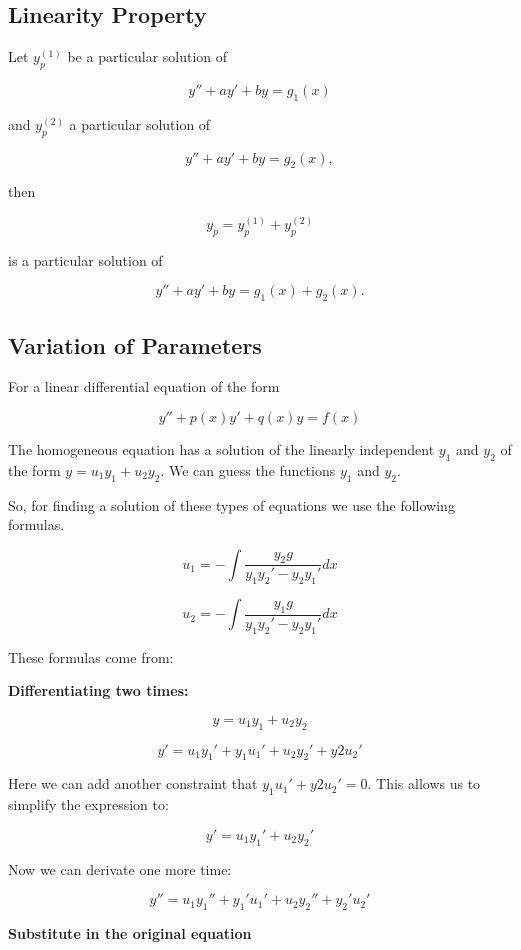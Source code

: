 \subsection{Linearity Property}

Let \( y_p^{(1)} \) be a particular solution of  

\[
    y'' + ay' + by = g_1(x)
\]  

and \( y_p^{(2)} \) a particular solution of  

\[
    y'' + ay' + by = g_2(x),
\]  

then  

\[
    y_p = y_p^{(1)} + y_p^{(2)}
\]  

is a particular solution of  

\[
    y'' + ay' + by = g_1(x) + g_2(x).
\]  

\subsection{Variation of Parameters}

For a linear differential equation of the form

\[
    y'' + p(x)y' + q(x)y = f(x)
\]

The homogeneous equation has a solution of the linearly independent \(y_1\) and \(y_2\)
of the form \(y = u_1 y_1 + u_2 y_2\). We can guess the functions \(y_1\) and \(y_2\).

So, for finding a solution of these types of equations we use the following formulas.

\[
    u_1 = - \int \frac{y_2 g}{y_1 y_{2}' - y_2 y_{1}'} dx
\]

\[
    u_2 = - \int \frac{y_1 g}{y_1 y_{2}' - y_2 y_{1}'} dx
\]

These formulas come from:

\textbf{Differentiating two times:}

\[
    y = u_1 y_1 + u_2 y_2
\]

\[
    y' = u_1 y_{1}' + y_1 u_{1}' +  u_2 y_{2}' + y{2} u_{2}'
\]

Here we can add another constraint that \(y_1 u_{1}' + y{2} u_{2}' = 0\). This allows us to
simplify the expression to:

\[
    y' = u_1 y_{1}' +  u_2 y_{2}'
\]

Now we can derivate one more time:

\[
    y'' =  u_1 y_{1}'' + y_{1}' u_{1}'  + u_2 y_{2}'' + y_{2}' u_{2}'
\]

\textbf{Substitute in the original equation}

